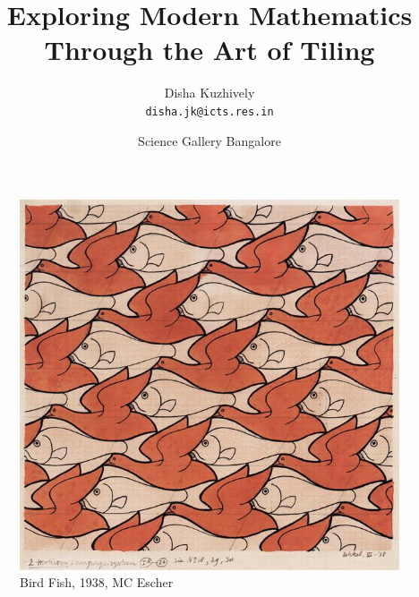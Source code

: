 \documentclass{beamer}
\title{Exploring Modern Mathematics Through the Art of Tiling}
\author[dishajk]{Disha Kuzhively\\ \texttt{disha.jk@icts.res.in}}
\institute{International Centre for Theoretical Sciences - TIFR, Bangalore}
\date[Sci560]{Science Gallery Bangalore}
\begin{document}
\begin{frame}
    \titlepage
\end{frame}
\begin{frame}
    \begin{figure}
        \includegraphics[height=0.8\textheight]{bird-fish}
        \caption{Bird Fish, 1938, MC Escher}    
    \end{figure}
\end{frame}
\end{document}
